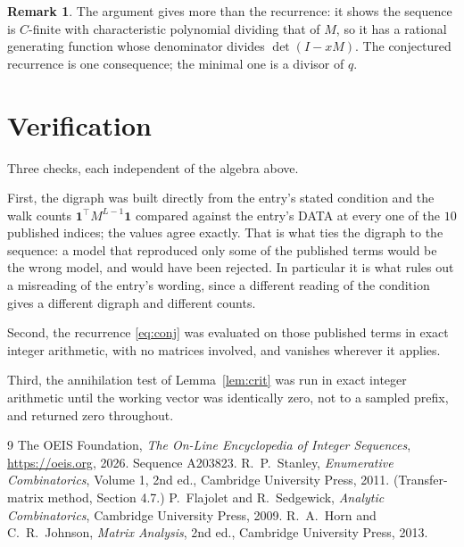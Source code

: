 \documentclass[11pt,a4paper]{article}
\theoremstyle{plain}
\theoremstyle{definition}
\newtheorem{remark}[theorem]{Remark}
\begin{document}
\begin{remark}
The argument gives more than the recurrence: it shows the sequence is $C$-finite with
characteristic polynomial dividing that of $M$, so it has a rational generating function
whose denominator divides $\det(I-xM)$. The conjectured recurrence is one consequence; the
minimal one is a divisor of $q$.
\end{remark}

\section{Verification}

Three checks, each independent of the algebra above.

First, the digraph was built directly from the entry's stated condition and the walk counts
$\mathbf{1}^{\!\top}M^{L-1}\mathbf{1}$ compared against the entry's DATA at
every one of the $10$ published indices; the values agree exactly. That is what ties
the digraph to the sequence: a model that reproduced only some of the published terms would
be the wrong model, and would have been rejected. In particular it is what rules out a
misreading of the entry's wording, since a different reading of the condition gives a
different digraph and different counts.

Second, the recurrence \eqref{eq:conj} was evaluated on those published terms in exact
integer arithmetic, with no matrices involved, and vanishes wherever it applies.

Third, the annihilation test of Lemma~\ref{lem:crit} was run in exact integer arithmetic
until the working vector was identically zero, not to a sampled prefix, and returned zero
throughout.

\begin{thebibliography}{9}
 The OEIS Foundation, \emph{The On-Line Encyclopedia of Integer
Sequences}, \url{https://oeis.org}, 2026. Sequence A203823.
 R.~P.~Stanley, \emph{Enumerative Combinatorics}, Volume 1, 2nd ed.,
Cambridge University Press, 2011. (Transfer-matrix method, Section 4.7.)
 P.~Flajolet and R.~Sedgewick, \emph{Analytic Combinatorics}, Cambridge
University Press, 2009.
 R.~A.~Horn and C.~R.~Johnson, \emph{Matrix Analysis}, 2nd ed., Cambridge
University Press, 2013.
\end{thebibliography}
\end{document}
